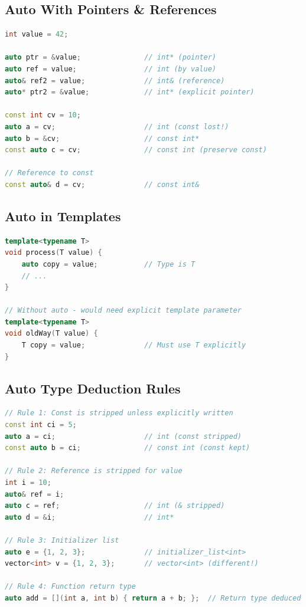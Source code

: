 \hypertarget{auto-with-pointers-references}{%
\subsection{Auto With Pointers \&
References}\label{auto-with-pointers-references}}

\begin{lstlisting}[language={C++}]
int value = 42;

auto ptr = &value;               // int* (pointer)
auto ref = value;                // int (by value)
auto& ref2 = value;              // int& (reference)
auto* ptr2 = &value;             // int* (explicit pointer)

const int cv = 10;
auto a = cv;                     // int (const lost!)
auto b = &cv;                    // const int*
const auto c = cv;               // const int (preserve const)

// Reference to const
const auto& d = cv;              // const int&
\end{lstlisting}

\hypertarget{auto-in-templates}{%
\subsection{Auto in Templates}\label{auto-in-templates}}

\begin{lstlisting}[language={C++}]
template<typename T>
void process(T value) {
    auto copy = value;           // Type is T
    // ...
}

// Without auto - would need explicit template parameter
template<typename T>
void oldWay(T value) {
    T copy = value;              // Must use T explicitly
}
\end{lstlisting}

\hypertarget{auto-type-deduction-rules}{%
\subsection{Auto Type Deduction Rules}\label{auto-type-deduction-rules}}

\begin{lstlisting}[language={C++}]
// Rule 1: Const is stripped unless explicitly written
const int ci = 5;
auto a = ci;                     // int (const stripped)
const auto b = ci;               // const int (const kept)

// Rule 2: Reference is stripped for value
int i = 10;
auto& ref = i;
auto c = ref;                    // int (& stripped)
auto d = &i;                     // int*

// Rule 3: Initializer list
auto e = {1, 2, 3};              // initializer_list<int>
vector<int> v = {1, 2, 3};       // vector<int> (different!)

// Rule 4: Function return type
auto add = [](int a, int b) { return a + b; };  // Return type deduced
\end{lstlisting}

